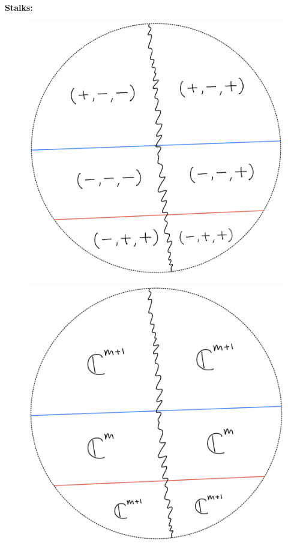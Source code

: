 \textbf{Stalks:}
\begin{figure}[H]
    \centering
    \includegraphics[scale = 0.95]{diagrams/lemma1/22.png} 
    \caption{}
    \label{fig:your-label}
\end{figure}
\begin{figure}[H]
    \centering
    \includegraphics[scale = 0.95]{diagrams/lemma1/23.png} 
    \caption{}
    \label{fig:your-label}
\end{figure}

